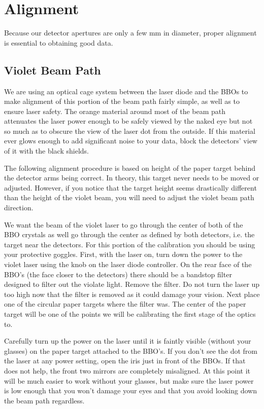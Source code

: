 \documentclass{../lab}
\begin{document}
\section{Alignment}
\label{sec:Alignment}

Because our detector apertures are only a few mm in diameter, proper alignment is essential to obtaining good data.

\subsection{Violet Beam Path}

We are using an optical cage system between the laser diode and the BBOs to make alignment of this portion of the beam path fairly simple, as well as to ensure laser safety. The orange material around most of the beam path attenuates the laser power enough to be safely viewed by the naked eye but not so much as to obscure the view of the laser dot from the outside. If this material ever glows enough to add significant noise to your data, block the detectors' view of it with the black shields.

The following alignment procedure is based on height of the paper target behind the detector arms being correct. In theory, this target never needs to be moved or adjusted. However, if you notice that the target height seems drastically different than the height of the violet beam, you will need to adjust the violet beam path direction.

We want the beam of the violet laser to go through the center of both of the BBO crystals as well go through the center as defined by both detectors, i.e. the target near the detectors. For this portion of the calibration you should be using your protective goggles. First, with the laser on, turn down the power to the violet laser using the knob on the laser diode controller. On the rear face of the BBO's (the face closer to the detectors) there should be a bandstop filter designed to filter out the violate light. Remove the filter. Do not turn the laser up too high now that the filter is removed as it could damage your vision. Next place one of the circular paper targets where the filter was. The center of the paper target will be one of the points we will be calibrating the first stage of the optics to.

Carefully turn up the power on the laser until it is faintly visible (without your glasses) on the paper target attached to the BBO's. If you don't see the dot from the laser at any power setting, open the iris just in front of the BBOs. If that does not help, the front two mirrors are completely misaligned. At this point it will be much easier to work without your glasses, but make sure the laser power is low enough that you won't damage your eyes and that you avoid looking down the beam path regardless.
\end{document}
